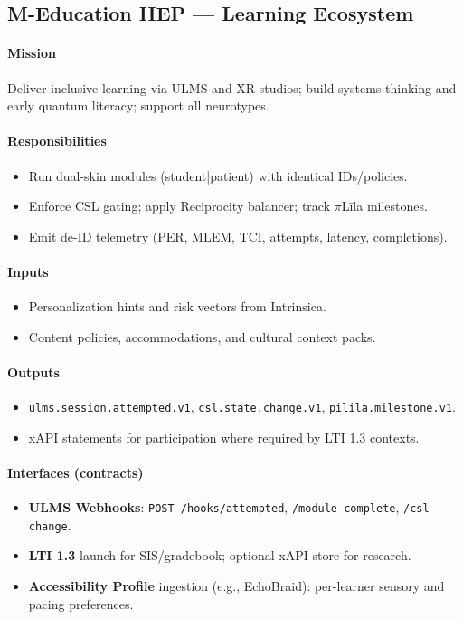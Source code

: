 \documentclass[11pt]{article}
\theoremstyle{plain}
\begin{document}
\bigskip
\subsection{M-Education HEP — Learning Ecosystem}

\paragraph{Mission}
Deliver inclusive learning via ULMS and XR studios; build systems thinking and early quantum literacy; support all neurotypes.

\paragraph{Responsibilities}
\begin{itemize}
  \item Run dual-skin modules (student|patient) with identical IDs/policies.
  \item Enforce CSL gating; apply Reciprocity balancer; track $\pi$Līla milestones.
  \item Emit de-ID telemetry (PER, MLEM, TCI, attempts, latency, completions).
\end{itemize}

\paragraph{Inputs}
\begin{itemize}
  \item Personalization hints and risk vectors from Intrinsica.
  \item Content policies, accommodations, and cultural context packs.
\end{itemize}

\paragraph{Outputs}
\begin{itemize}
  \item \texttt{ulms.session.attempted.v1}, \texttt{csl.state.change.v1}, \texttt{pilila.milestone.v1}.
  \item xAPI statements for participation where required by LTI 1.3 contexts.
\end{itemize}

\paragraph{Interfaces (contracts)}
\begin{itemize}
  \item \textbf{ULMS Webhooks}: \texttt{POST /hooks/attempted}, \texttt{/module-complete}, \texttt{/csl-change}.
  \item \textbf{LTI 1.3} launch for SIS/gradebook; optional xAPI store for research.
  \item \textbf{Accessibility Profile} ingestion (e.g., EchoBraid): per-learner sensory and pacing preferences.
\end{itemize}
\end{document}
